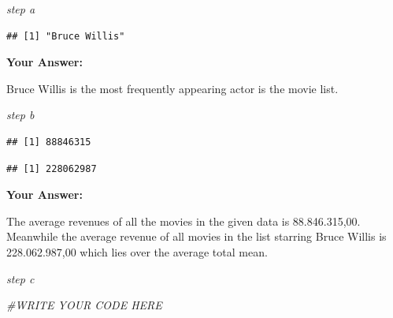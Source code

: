 \documentclass[
]{article}
\newenvironment{Shaded}{\begin{snugshade}}{\end{snugshade}}
\newcommand{\AttributeTok}[1]{\textcolor[rgb]{0.13,0.29,0.53}{#1}}
\newcommand{\CommentTok}[1]{\textcolor[rgb]{0.56,0.35,0.01}{\textit{#1}}}
\newcommand{\ConstantTok}[1]{\textcolor[rgb]{0.56,0.35,0.01}{#1}}
\newcommand{\DecValTok}[1]{\textcolor[rgb]{0.00,0.00,0.81}{#1}}
\newcommand{\FunctionTok}[1]{\textcolor[rgb]{0.13,0.29,0.53}{\textbf{#1}}}
\newcommand{\NormalTok}[1]{#1}
\newcommand{\OtherTok}[1]{\textcolor[rgb]{0.56,0.35,0.01}{#1}}
\newcommand{\SpecialCharTok}[1]{\textcolor[rgb]{0.81,0.36,0.00}{\textbf{#1}}}
\newcommand{\StringTok}[1]{\textcolor[rgb]{0.31,0.60,0.02}{#1}}
\begin{document}
\emph{step a}

\begin{Shaded}
\end{Shaded}

\begin{verbatim}
## [1] "Bruce Willis"
\end{verbatim}

\textbf{Your Answer:}

Bruce Willis is the most frequently appearing actor is the movie list.

\emph{step b}

\begin{Shaded}
\end{Shaded}

\begin{verbatim}
## [1] 88846315
\end{verbatim}

\begin{Shaded}
\end{Shaded}

\begin{verbatim}
## [1] 228062987
\end{verbatim}

\textbf{Your Answer:}

The average revenues of all the movies in the given data is
88.846.315,00. Meanwhile the average revenue of all movies in the list
starring Bruce Willis is 228.062.987,00 which lies over the average
total mean.

\emph{step c}

\begin{Shaded}
\begin{Highlighting}[]
\CommentTok{\#WRITE YOUR CODE HERE}
\end{Highlighting}
\end{Shaded}
\end{document}
